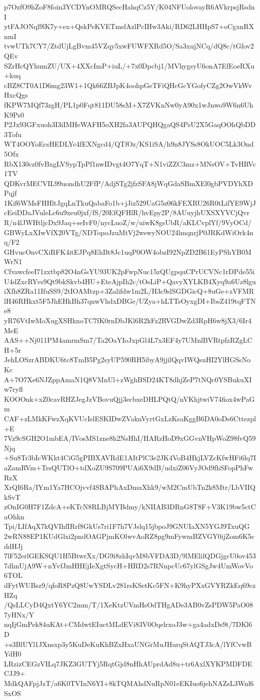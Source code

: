 p7OzfO9hZoF8foin3YCDYnOMRQSecHahqCz5Y/K04NFUolovayR6AVkrpsjRsdnI
ytFAJONql9lK7y+ex+QskPeKVETmsfAzlPcIHw3Aki/RD62LHHpS7+oCgxnRXnmI
tvwUTk7CY7/ZtdUjLgBvm45VZqy5xwFUWFXRd5O/Sa3xujNCq/dQ8c/tGfov2QEv
SZrHcQYhumZU/UX+4XXcImP+iuL/+7x0Dpcbj1/MVhygsyU6onA7EfEoeRXu+kuq
cBZ8CT0A1D6mg23W1+1Qk66ZBJpK4oohpGeTFiQHcGcYGofyCZg2OwVkWvHxcQgs
fKPW7MQf73zgH/PL1p0Fqt811DU58sM+X7ZVKnNw0yA90x1wJnwo9W6n6UhK9Ps0
P2Jx93GFxuoh3I3iIMHeWAFH5oXH2fa3AUPQHQgaQS4PsU2X5GaqOOhQbDD3Tofu
WT4OOYoEcsHEDLYc4fEXNgcd4/QTfOz/KS1iSA/h9n8JYSs8OkUOC5Lk3Ond5Ofx
RbX130cz0fvBxgLVSypTpPf1nwIDvgt4O7YqT+N1viZZC3mz+MNsOV+TvHRVc1TV
QDKvrMECVIL99uondhU2FfP/AdjSTg2jfzSFA8jWqGdaSBmXEl0gbPVDYhXDPqjf
1Kif6WMsFHHltJgqLnTkuQabaFo1b+jJiz529UaG5z06kFEXRU26R0tLifYE9WjJ
cEeiDDaJVuleLc6u9xeu0jxf/fS/20EfQFHlR/hvEpy2P/8AUuyjhUXSXYVCjQvr
R/n4lJWHtljcDx9Jaq+seIvF0/nycLuoZ/w/uiwK8gsUbR/aKLCvplYf/9VyOCd/
GBWyLxXIwVfX20VTg/NDTopoJzuMtVj2wswyNOU24lmqnrjP0JRKdWiOrk4nq/F2
GHvucOnvCXiRFK4itEJPq8EhBt8Jc1uqP0OW4obzI92NpZD2B61EyPShYB0MWrN1
CfvawcfeeI71zxtbp82O4nGsYU93UK2pFwpNuc15zQUgpquCPrUCVNc1rDPde55i
U4dZxcRYvs9Qt9bkSkvb4HU+EteAjpIh2c/tOsLiP+QavyXYLKB4Xyq9a6Uz8lgu
iXfh8ZRa11IfuSS9/2tIOAMtzp+3Zalifdw1m2L/H3c9slSGDGicQ+8uGe+zVFMR
lH46RHkxt5F5JhEHkBh37qnwVhdxDBGe/UZya+hLTTsOyxgDI+IbsZ419tqFTNe8
yR76VtIwMoXugXSHknoTC7fK0rnDbJKl6R2kFz2RVGDwZd3RpH6w8jX3/6Ir4MeE
AAS++Nj011PM4amrmSm7/Ta2OaYIoJxpGl4L7x3EF4y7UMnlBVRtpfzRZgLCH+5r
JehLOSzrABDKU6tc8TmB5Pg2syUP590RH5ibyA9jjilQqvIWQsuHI2YlHGSsNoKc
A+7O7Xe6NJZppAmaN1Q8VMnUl+zWghBSD24KT8dhjZeP7tNQc0YSBukuXIw7ryfl
KOOOnk+xZ0cavRHZJegJzVBovuQjj3ecbxeDHLPQtQ/nVKhjtwiV74fiox4wPaGm
CAF+zLMkKFwzXqKVUcIslESKIDwZVaknVyrtGxLzKsaKggB6DA0oDs6Cttezpl+E
7Vz9cSGH2O1mbEA/IVosMS1zne8h2NsHhI/HARzHoD9xGGvnVHpWoZ98fvQ59Njq
+Su8Tr3bIcWKkt4CiG5gPIBXAVRdE1AItPlC3e2JK4VoB4HkjLVZcKfwHFi6lq7I
aZamRVm+TrsQUTlO+tdXoZU9S709PUAi6X9dB/udxiZ06VyJOd9fhSFopPhFwRzX
XrQI6Ra/IYm1Ya7HCOjvvf4SBAPhAxDmuXhk9/wM2CmUbTn2k8Mtr/LbVIIQkSvT
zOnIG0H7F1ZdcA+eKTcN8RLBjMYBdmy/kNIIAB3DRnG8T8F+V3K19bw5ctCaOhkn
Tpi/LIfAqX7kQVIhfIRrf8GkUs7ri1F7h7VJslq15jbpoJ9GNUIaXN5YGJ9TxuQG
2wRN88EP1KUdGlxi2pndOAGPjmKOlwvAoRZ8pg9mFywmBZVGY0ijZom6K5cddHJj
7lF52erlGEKSQU1H5BtwrXx/DG9i8zhIqvM8bVFDA3D/9lMElilQDGjgcU0ov453
7dhnUjA9W+nYvfJmHHEjIeXgtSycH+HRD2s7RNnpcUc67ylGSgJw4UmWovVo6TOL
dFytWUBsz9/qfoR8PzQ8UwYSDLv281rsKSetKc5FN+K9hyPXxGVYRZkEq69czHZq
/QsLLCyD4QxtY6YC2mm/T/1XeKtzUVmHsOdTHgADe3AB0vZsPDW5PaO087yHNx/Y
nqIjGmPek84uKAt+CMdwtEIuctMLdEVi83V0OqelrxoJ3w+ga4adxDs9t/7DKl6D
+s3BlUYl1JXnsxp3y5KuDeKuKhBZxHxaUNGrMuJHurqStAQTJ3cA/lYfCvwBYdH0
LRzizCEGzVILq7JKZ3GUTYj5RqtGjd8nHhAUprdAd8u+tr6AxlXYKPMDFDECJJ9+
MdkQAFpjJzT/a6K0TVInN6YI+8kTQMAhdNuRpN01eEKIuo6jehNAZsL3Wnl6SxOS
